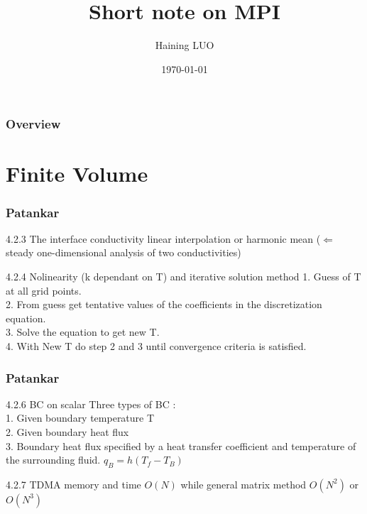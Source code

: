 \documentclass{beamer}
\title[Short title]{Short note on MPI} %
\author{Haining LUO} %
\institute[] %
{
ECL \\ %
\medskip
\textit{haining.luo@doctorant.ec-lyon.fr} %
}
\date{\today} %
\begin{document}
\begin{frame}
\titlepage %
\end{frame}

\begin{frame}
\frametitle{Overview} %
\tableofcontents %
\end{frame}

\section{Finite Volume}
\begin{frame}
\frametitle{Patankar}
\begin{block}{4.2.3 The interface conductivity}
	linear interpolation or harmonic mean ($\Leftarrow$ steady one-dimensional analysis of two conductivities)
\end{block}
\begin{block}{4.2.4 Nolinearity (k dependant on T) and iterative solution method}
	1. Guess of T at all grid points. \\
	2. From guess get tentative values of the coefficients in the discretization equation. \\
	3. Solve the equation to get new T. \\
  4. With New T do step 2 and 3 until convergence criteria is satisfied.
\end{block}

\end{frame}

\begin{frame}
\frametitle{Patankar}
\begin{block}{4.2.6 BC on scalar}
	Three types of BC : \\
	1. Given boundary temperature T \\
	2. Given boundary heat flux \\
	3. Boundary heat flux specified by a heat transfer coefficient and temperature of the surrounding fluid. $q_B=h(T_f-T_B)$
\end{block}
\begin{block}{4.2.7 TDMA}
	memory and time $O(N)$ while general matrix method $O(N^2)$  or $O(N^3)$ 
\end{block}
\end{frame}
\end{document}
